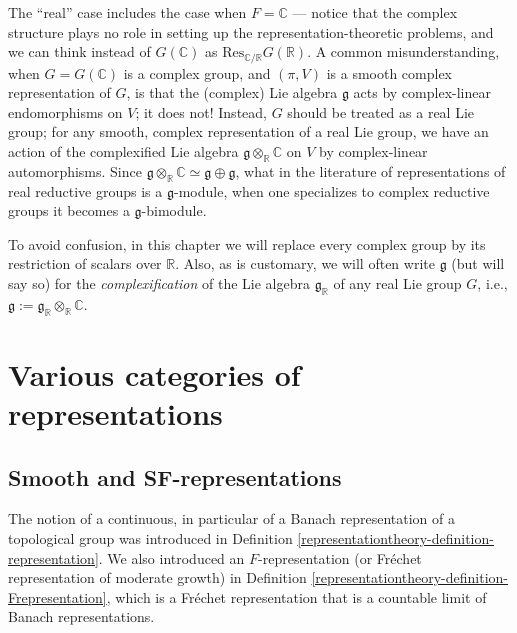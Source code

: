 \begin{remark}
 \label{remark-complexification-Lie-algebra}
The ``real'' case includes the case when $F=\mathbb C$ --- notice that the complex structure plays no role in setting up the representation-theoretic problems, and we can think instead of $G(\mathbb C)$ as $\text{Res}_{\mathbb C/\mathbb R} G(\mathbb R)$. A common misunderstanding, when $G=G(\mathbb C)$ is a complex group, and $(\pi,V)$ is a smooth complex representation of $G$, is that the (complex) Lie algebra $\mathfrak g$ acts by complex-linear endomorphisms on $V$; it does not! Instead, $G$ should be treated as a real Lie group; for any smooth, complex representation of a real Lie group, we have an action of the complexified Lie algebra $\mathfrak g\otimes_{\mathbb R} \mathbb C$ on $V$ by complex-linear automorphisms. Since $\mathfrak g\otimes_{\mathbb R} \mathbb C \simeq \mathfrak g \oplus \mathfrak g$, what in the literature of representations of real reductive groups is a $\mathfrak g$-module, when one specializes to complex reductive groups it becomes a $\mathfrak g$-bimodule. 

To avoid confusion, in this chapter we will replace every complex group by its restriction of scalars over $\mathbb R$. Also, as is customary, we will often write $\mathfrak g$ (but will say so) for the \emph{complexification} of the Lie algebra $\mathfrak g_{\mathbb R}$ of any real Lie group $G$, i.e., $\mathfrak g := \mathfrak g_{\mathbb R}\otimes_{\mathbb R} \mathbb C$. 
\end{remark}


\section{Various categories of representations}
\label{section-categories-representations}

\subsection{Smooth and SF-representations}
\label{subsection-smooth-SF-representations}


The notion of a continuous, in particular of a Banach representation of a topological group was introduced in Definition \ref{representationtheory-definition-representation}. We also introduced an $F$-representation (or Fr\'echet representation of moderate growth) in Definition \ref{representationtheory-definition-Frepresentation}, which is a Fr\'echet representation that is a countable limit of Banach representations. 

